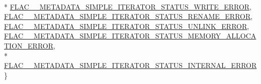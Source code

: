 \begin{DoxyCompactItemize}
\\*
\hyperlink{group__flac__metadata__level1_ggac926e7d2773a05066115cac9048bbec9ac2337299c2347ca311caeaa7d71d857c}{F\+L\+A\+C\+\_\+\+\_\+\+M\+E\+T\+A\+D\+A\+T\+A\+\_\+\+S\+I\+M\+P\+L\+E\+\_\+\+I\+T\+E\+R\+A\+T\+O\+R\+\_\+\+S\+T\+A\+T\+U\+S\+\_\+\+W\+R\+I\+T\+E\+\_\+\+E\+R\+R\+OR}, 
\hyperlink{group__flac__metadata__level1_ggac926e7d2773a05066115cac9048bbec9a2e073843fa99419d76a0b210da96ceb6}{F\+L\+A\+C\+\_\+\+\_\+\+M\+E\+T\+A\+D\+A\+T\+A\+\_\+\+S\+I\+M\+P\+L\+E\+\_\+\+I\+T\+E\+R\+A\+T\+O\+R\+\_\+\+S\+T\+A\+T\+U\+S\+\_\+\+R\+E\+N\+A\+M\+E\+\_\+\+E\+R\+R\+OR}, 
\hyperlink{group__flac__metadata__level1_ggac926e7d2773a05066115cac9048bbec9a4f855433038c576da127fc1de9d18f9b}{F\+L\+A\+C\+\_\+\+\_\+\+M\+E\+T\+A\+D\+A\+T\+A\+\_\+\+S\+I\+M\+P\+L\+E\+\_\+\+I\+T\+E\+R\+A\+T\+O\+R\+\_\+\+S\+T\+A\+T\+U\+S\+\_\+\+U\+N\+L\+I\+N\+K\+\_\+\+E\+R\+R\+OR}, 
\hyperlink{group__flac__metadata__level1_ggac926e7d2773a05066115cac9048bbec9aa8386ed0a20d7e91b0022d203ec3cdec}{F\+L\+A\+C\+\_\+\+\_\+\+M\+E\+T\+A\+D\+A\+T\+A\+\_\+\+S\+I\+M\+P\+L\+E\+\_\+\+I\+T\+E\+R\+A\+T\+O\+R\+\_\+\+S\+T\+A\+T\+U\+S\+\_\+\+M\+E\+M\+O\+R\+Y\+\_\+\+A\+L\+L\+O\+C\+A\+T\+I\+O\+N\+\_\+\+E\+R\+R\+OR}, 
\\*
\hyperlink{group__flac__metadata__level1_ggac926e7d2773a05066115cac9048bbec9a9d821ae65a1c5de619daa88c850906df}{F\+L\+A\+C\+\_\+\+\_\+\+M\+E\+T\+A\+D\+A\+T\+A\+\_\+\+S\+I\+M\+P\+L\+E\+\_\+\+I\+T\+E\+R\+A\+T\+O\+R\+\_\+\+S\+T\+A\+T\+U\+S\+\_\+\+I\+N\+T\+E\+R\+N\+A\+L\+\_\+\+E\+R\+R\+OR}
 \}
\end{DoxyCompactItemize}
